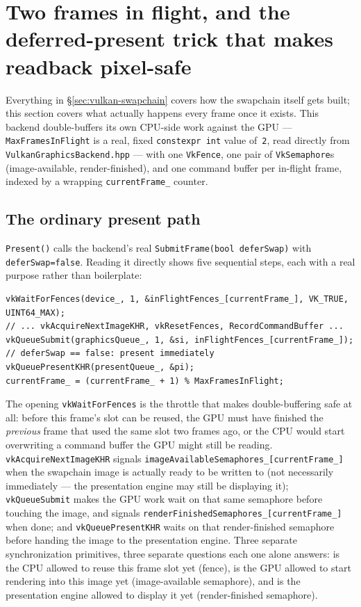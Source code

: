 \section[Two frames in flight, and the deferred-present trick]{Two frames in flight, and
the deferred-present trick that makes readback pixel-safe}
\label{sec:vulkan-frames-in-flight}

Everything in \S\ref{sec:vulkan-swapchain} covers how the swapchain itself gets built; this
section covers what actually happens every frame once it exists. This backend double-buffers
its own CPU-side work against the GPU --- \texttt{MaxFramesInFlight} is a real, fixed
\texttt{constexpr int} value of~\texttt{2}, read directly from
\texttt{VulkanGraphicsBackend.hpp} --- with one \texttt{VkFence}, one pair of
\texttt{VkSemaphore}s (image-available, render-finished), and one command buffer per
in-flight frame, indexed by a wrapping \texttt{currentFrame\_} counter.

\subsection{The ordinary present path}

\texttt{Present()} calls the backend's real \texttt{SubmitFrame(bool deferSwap)} with
\texttt{deferSwap=false}. Reading it directly shows five sequential steps, each with a real
purpose rather than boilerplate:

\begin{lstlisting}
vkWaitForFences(device_, 1, &inFlightFences_[currentFrame_], VK_TRUE, UINT64_MAX);
// ... vkAcquireNextImageKHR, vkResetFences, RecordCommandBuffer ...
vkQueueSubmit(graphicsQueue_, 1, &si, inFlightFences_[currentFrame_]);
// deferSwap == false: present immediately
vkQueuePresentKHR(presentQueue_, &pi);
currentFrame_ = (currentFrame_ + 1) % MaxFramesInFlight;
\end{lstlisting}

The opening \texttt{vkWaitForFences} is the throttle that makes double-buffering safe at all:
before this frame's slot can be reused, the GPU must have finished the \emph{previous} frame
that used the same slot two frames ago, or the CPU would start overwriting a command buffer
the GPU might still be reading. \texttt{vkAcquireNextImageKHR} signals
\texttt{imageAvailableSemaphores\_[currentFrame\_]} when the swapchain image is actually ready
to be written to (not necessarily immediately --- the presentation engine may still be
displaying it); \texttt{vkQueueSubmit} makes the GPU work wait on that same semaphore before
touching the image, and signals \texttt{renderFinishedSemaphores\_[currentFrame\_]} when done;
and \texttt{vkQueuePresentKHR} waits on that render-finished semaphore before handing the image
to the presentation engine. Three separate synchronization primitives, three separate
questions each one alone answers: is the CPU allowed to reuse this frame slot yet (fence), is
the GPU allowed to start rendering into this image yet (image-available semaphore), and is the
presentation engine allowed to display it yet (render-finished semaphore).

